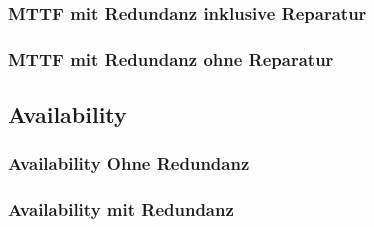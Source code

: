 \documentclass[
            a4paper
            ]{scrartcl}%
\begin{document}
\subsubsection{MTTF mit Redundanz inklusive Reparatur}

\subsubsection{MTTF mit Redundanz ohne Reparatur}

\subsection{Availability}
\subsubsection{Availability Ohne Redundanz}

\subsubsection{Availability mit Redundanz}

\end{document}

